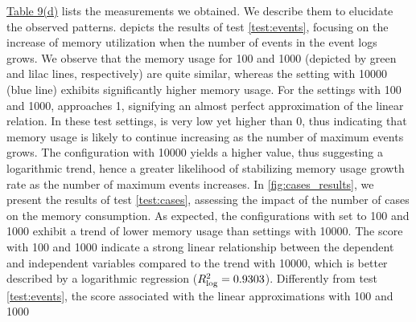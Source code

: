 \hyperref[table:TestCoefficentTable]{Table 9(d)} lists the measurements we obtained. We describe them to elucidate the observed patterns.  depicts the results of test \ref{test:events}, focusing on the increase of memory utilization when the number of events in the event logs grows. We observe that the memory usage for {\SegSize} \num{100} and \num{1000} (depicted by green and lilac lines, respectively) are quite similar, whereas the setting with {\SegSize} \num{10000} (blue line) exhibits significantly higher memory usage. For the settings with {\SegSize} \num{100} and \num{1000}, {\Rlin} approaches \num{1}, %
signifying an almost perfect approximation of the linear relation. %
In these test settings, {\Slope} is very low %
yet higher than \num{0}, thus indicating that memory usage is likely to continue increasing as the number of maximum events grows. The configuration with {\SegSize} \num{10000} yields a higher {\Rlog} value, %
thus suggesting a logarithmic trend, hence %
a greater likelihood of stabilizing memory usage growth rate as the number of maximum events increases. 
%
In  \cref{fig:cases_results}, we present the results of test \ref{test:cases}, assessing the impact of the number of cases on the memory consumption. As expected, the configurations with {\SegSize} set to \num{100} and \num{1000} exhibit a trend of lower memory usage than settings with {\SegSize} \num{10000}. The {\Rlin} score with {\SegSize} \num{100} and \num{1000} %
indicate a strong linear relationship between the dependent and independent variables compared to the trend with {\SegSize} \num{10000}, which is better described by a logarithmic regression (${R^2_\textrm{log}} = \num{0.9303}$). %
Differently from test \ref{test:events}, the {\Slope} score associated with the linear approximations with {\SegSize} \num{100} and \num{1000} %
